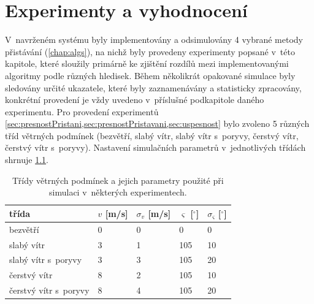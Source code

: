\chapter{Experimenty a vyhodnocení} \label{chap:eval} %
  V~navrženém systému byly implementovány a odsimulovány 4 vybrané metody přistávání (\cref{chap:algs}), na nichž byly provedeny experimenty popsané v~této kapitole, které sloužily primárně ke zjištění rozdílů mezi implementovanými algoritmy podle různých hledisek. Během několikrát opakované simulace byly sledovány určité ukazatele, které byly zaznamenávány a statisticky zpracovány, konkrétní provedení je vždy uvedeno v~příslušné podkapitole daného experimentu. Pro provedení experimentů \cref*{sec:presnostPristani,sec:presnostPristavani,sec:uspesnost} bylo zvoleno 5 různých tříd větrných podmínek (bezvětří, slabý vítr, slabý vítr s~poryvy, čerstvý vítr, čerstvý vítr s~poryvy). Nastavení simulačních parametrů v~jednotlivých třídách shrnuje \cref{tab:tridyVetru}.
  \begin{table}[H]
    \centering
    \begin{tabular}{@{}lllll@{}}
      \hline
      třída & $v$ [m/s] & $\sigma_v$ [m/s] & $\varsigma$ [$^{\circ}$] & $\sigma_\varsigma$ [$^{\circ}$] \bigstrut\\
      \hline
      bezvětří & 0     & 0     & 0     & 0 \bigstrut[t]\\
      slabý vítr & 3     & 1     & 105   & 10 \\
      slabý vítr s~poryvy & 3     & 3     & 105   & 20 \\
      čerstvý vítr & 8     & 2     & 105   & 10 \\
      čerstvý vítr s~poryvy & 8     & 4     & 105   & 20 \bigstrut[b]\\
      \hline
      \end{tabular}%
    \caption[Třídy větrných podmínek]{Třídy větrných podmínek a jejich parametry použité při simulaci v~některých experimentech.}
    \label{tab:tridyVetru}
  \end{table}

